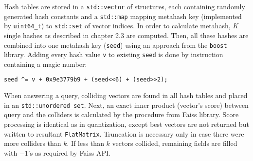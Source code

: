 Hash tables are stored in a \texttt{std::vector} of structures, each containing
randomly generated hash constants and a \texttt{std::map} mapping
metahash key (implemented by \texttt{uint64\_t}) to \texttt{std::set} of vector indices.
In order to calculate metahash, $K$ single hashes as described in chapter 2.3 are computed.
Then, all these hashes are combined into one metahash key (\texttt{seed}) using an approach from the
\texttt{boost} library. Adding every hash value \texttt{v} to existing \texttt{seed} is done
by instruction containing a magic number:
\begin{verbatim}
seed ^= v + 0x9e3779b9 + (seed<<6) + (seed>>2);
\end{verbatim}

When answering a query, colliding vectors are found in all hash
tables and placed in an \texttt{std::unordered\_set}. Next, an exact inner product (vector's score)
between query and the colliders is calculated by the  procedure from Faiss library.
Score processing is identical as in quantization, except best vectors are not returned but
written to resultant \texttt{FlatMatrix}. Truncation is necessary only in case there were more
colliders than $k$.
If less than $k$ vectors collided, remaining fields are filled with $-1$'s as required by
Faiss API.
